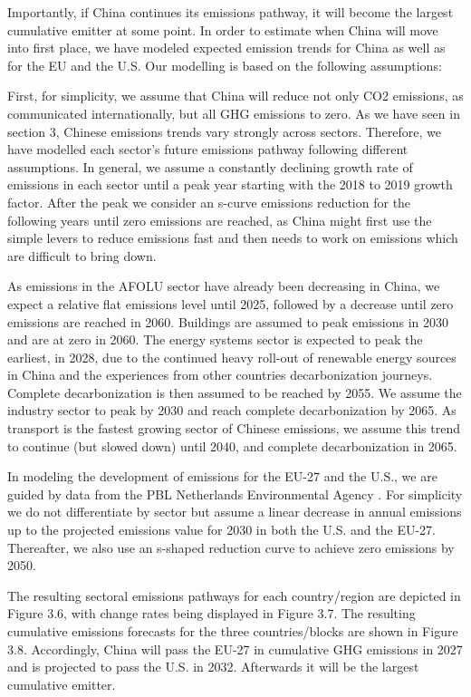 \documentclass[
  12pt,
]{article}
\numberwithin{equation}{section}
\numberwithin{table}{section}
\numberwithin{figure}{section}
\begin{document}
Importantly, if China continues its emissions pathway, it will become
the largest cumulative emitter at some point. In order to estimate when
China will move into first place, we have modeled expected emission
trends for China as well as for the EU and the U.S. Our modelling is
based on the following assumptions:

First, for simplicity, we assume that China will reduce not only CO2
emissions, as communicated internationally, but all GHG emissions to
zero. As we have seen in section 3, Chinese emissions trends vary
strongly across sectors. Therefore, we have modelled each sector's
future emissions pathway following different assumptions. In general, we
assume a constantly declining growth rate of emissions in each sector
until a peak year starting with the 2018 to 2019 growth factor. After
the peak we consider an s-curve emissions reduction for the following
years until zero emissions are reached, as China might first use the
simple levers to reduce emissions fast and then needs to work on
emissions which are difficult to bring down.

As emissions in the AFOLU sector have already been decreasing in China,
we expect a relative flat emissions level until 2025, followed by a
decrease until zero emissions are reached in 2060. Buildings are assumed
to peak emissions in 2030 and are at zero in 2060. The energy systems
sector is expected to peak the earliest, in 2028, due to the continued
heavy roll-out of renewable energy sources in China and the experiences
from other countries decarbonization journeys. Complete decarbonization
is then assumed to be reached by 2055. We assume the industry sector to
peak by 2030 and reach complete decarbonization by 2065. As transport is
the fastest growing sector of Chinese emissions, we assume this trend to
continue (but slowed down) until 2040, and complete decarbonization in
2065.

In modeling the development of emissions for the EU-27 and the U.S., we
are guided by data from the PBL Netherlands Environmental Agency
\citep{PBL2022}. For simplicity we do not differentiate by sector but
assume a linear decrease in annual emissions up to the projected
emissions value for 2030 in both the U.S. and the EU-27. Thereafter, we
also use an s-shaped reduction curve to achieve zero emissions by 2050.

The resulting sectoral emissions pathways for each country/region are
depicted in Figure 3.6, with change rates being displayed in Figure 3.7.
The resulting cumulative emissions forecasts for the three
countries/blocks are shown in Figure 3.8. Accordingly, China will pass
the EU-27 in cumulative GHG emissions in 2027 and is projected to pass
the U.S. in 2032. Afterwards it will be the largest cumulative emitter.
\end{document}
